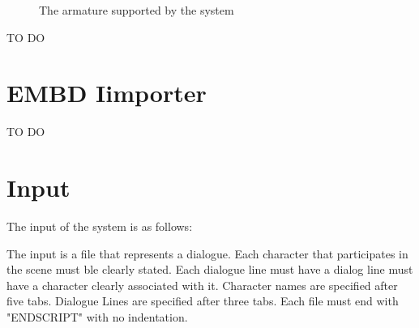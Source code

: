 \begin{figure}[!ht]
\centerline{}
\caption{The armature supported by the system}\label{fig:armature}
\end{figure}

TO DO

\section{EMBD Iimporter}

TO DO

\section{Input}

The input of the system is as follows:

The input is a file that represents a dialogue. Each character that participates in the scene must ble clearly stated. Each dialogue line must have a dialog line must have a character clearly associated with it. Character names are specified after five tabs. Dialogue Lines are specified after three tabs. Each file must end with "ENDSCRIPT" with no indentation.

